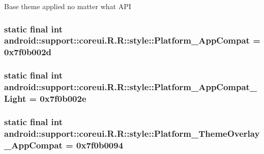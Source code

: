 Base theme applied no matter what API \hypertarget{classandroid_1_1support_1_1coreui_1_1_r_1_1style_6a02f5b511fcc7edf8c7b6a52b2f4453}{
\subsubsection[{Platform\_\-AppCompat}]{\setlength{\rightskip}{0pt plus 5cm}static final int android::support::coreui.R.R::style::Platform\_\-AppCompat = 0x7f0b002d}}
\label{classandroid_1_1support_1_1coreui_1_1_r_1_1style_6a02f5b511fcc7edf8c7b6a52b2f4453}


\hypertarget{classandroid_1_1support_1_1coreui_1_1_r_1_1style_e57c2eff8caec03c30e04b2d0708e88b}{
\subsubsection[{Platform\_\-AppCompat\_\-Light}]{\setlength{\rightskip}{0pt plus 5cm}static final int android::support::coreui.R.R::style::Platform\_\-AppCompat\_\-Light = 0x7f0b002e}}
\label{classandroid_1_1support_1_1coreui_1_1_r_1_1style_e57c2eff8caec03c30e04b2d0708e88b}


\hypertarget{classandroid_1_1support_1_1coreui_1_1_r_1_1style_7c2bfd1d56d857cb018c3f21692c7cb8}{
\subsubsection[{Platform\_\-ThemeOverlay\_\-AppCompat}]{\setlength{\rightskip}{0pt plus 5cm}static final int android::support::coreui.R.R::style::Platform\_\-ThemeOverlay\_\-AppCompat = 0x7f0b0094}}
\label{classandroid_1_1support_1_1coreui_1_1_r_1_1style_7c2bfd1d56d857cb018c3f21692c7cb8}


